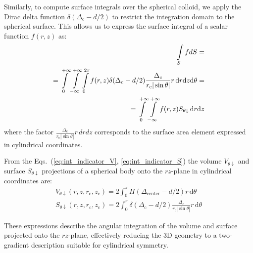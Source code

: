 \documentclass[10pt, a4paper, twocolumn]{article}
\begin{document}
Similarly, to compute surface integrals over the spherical colloid, we apply the Dirac delta function $\delta(\Delta_{\text{c}} - d/2)$ to restrict the integration domain to the spherical surface.
This allows us to express the surface integral of a scalar function $f(r,z)$ as:
\begin{eqnarray}
    \label{eq:int_indicator_S}
    \begin{aligned}
        \int\limits_{S} f dS = \\
        = \int\displaylimits_{0}^{+\infty} \int\displaylimits_{-\infty}^{+\infty} \int\displaylimits_{0}^{2\pi} f(r, z) \delta(\Delta_{\text{c}} - d/2)  \frac{\Delta_{\text{c}}}{r_{\text{c}} |\sin\theta|} r \, \text{d}r \text{d}z \text{d}\theta=\\
        =\int\displaylimits_{0}^{+\infty} \int\displaylimits_{-\infty}^{+\infty} f(r, z)  S_{\theta \downarrow} \, \text{d}r \text{d}z
    \end{aligned}
\end{eqnarray}
where the factor $\frac{\Delta_{\text{c}}}{r_{\text{c}} |\sin\theta|}r \, dr dz$ corresponds to the surface area element expressed in cylindrical coordinates.


From the Eqs.~(\ref{eq:int_indicator_V}, \ref{eq:int_indicator_S}) the volume $V_{\theta \downarrow}$ and surface $S_{\theta \downarrow}$ projections of a spherical body onto the $rz$-plane in cylindrical coordinates are:
\begin{gather}
    V_{\theta \downarrow}(r, z, r_{\text{c}}, z_{\text{c}}) = 2\int_{0}^{\pi} H\!\left( \Delta_{\text{center}} - {d}/{2} \right) r \, \text{d}\theta
    \\
    S_{\theta \downarrow}(r, z, r_{\text{c}}, z_{\text{c}}) = 2\int_{0}^{\pi}\delta(\Delta_{\text{c}} - d/2)  \frac{\Delta_{\text{c}}}{r_{\text{c}} |\sin\theta|} r \, \text{d}\theta
\end{gather}

These expressions describe the angular integration of the volume and surface projected onto the $rz$-plane, effectively reducing the 3D geometry to a two-gradient description suitable for cylindrical symmetry.
\end{document}
